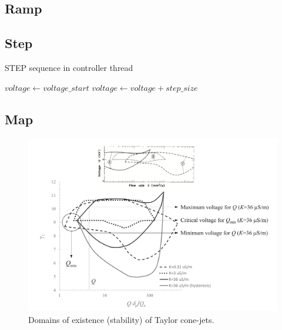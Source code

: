 \subsection{Ramp}



\subsection{Step}


\begin{algorithm}
    \caption{STEP sequence in controller thread}\label{alg:stepping_algorithm}
    \begin{algorithmic}
        \State $voltage \gets voltage\_start$
         
            \State {}
            \State {}
            \State $voltage \gets voltage + step\_size$
        \EndWhile
    \EndProcedure

    \end{algorithmic}
\end{algorithm}

\subsection{Map}

    \begin{figure}[H]
        \center
        \includegraphics[width=13cm]{Figuras/ganan_calvo_map.png}
        \caption{Domains of existence (stability) of Taylor cone-jets. \cite{gananCalvo} }
        \label{fig:ganan_calvo_fig}
    \end{figure}


